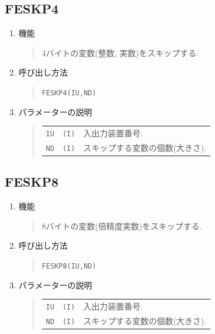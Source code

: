\subsection{FESKP4}
\begin{enumerate}
  \item 機能 
  \begin{quote}
   4バイトの変数(整数, 実数)をスキップする.
  \end{quote}
  \item 呼び出し方法 
  \begin{quote}
   {\tt FESKP4(IU,ND)}
  \end{quote}
  \item パラメーターの説明 
  \begin{quote}
    \begin{tabular}{llp{10cm}}
      {\tt IU}   & {\tt (I)} & 入出力装置番号. \\
      {\tt ND}   & {\tt (I)} & スキップする変数の個数(大きさ).
    \end{tabular}
  \end{quote}
\end{enumerate}

\subsection{FESKP8}
\begin{enumerate}
  \item 機能 
  \begin{quote}
   8バイトの変数(倍精度実数)をスキップする.
  \end{quote}
  \item 呼び出し方法 
  \begin{quote}
   {\tt FESKP8(IU,ND)}
  \end{quote}
  \item パラメーターの説明 
  \begin{quote}
    \begin{tabular}{llp{10cm}}
      {\tt IU}   & {\tt (I)} & 入出力装置番号. \\
      {\tt ND}   & {\tt (I)} & スキップする変数の個数(大きさ).
    \end{tabular}
  \end{quote}
\end{enumerate}

